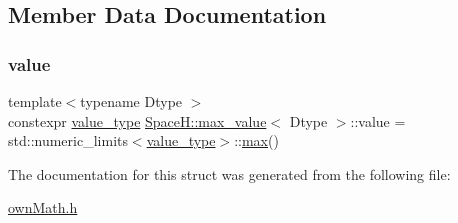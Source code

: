 \subsection{Member Data Documentation}
\mbox{\label{struct_space_h_1_1max__value_af27ab405cbcf92a3e6213eb9ae5c97b6}} 
\subsubsection{\texorpdfstring{value}{value}}
{\footnotesize\ttfamily template$<$typename Dtype $>$ \\
constexpr \mbox{\hyperlink{struct_space_h_1_1max__value_ae43b9c4bb300e03280887ef4144c40af}{value\+\_\+type}} \mbox{\hyperlink{struct_space_h_1_1max__value}{Space\+H\+::max\+\_\+value}}$<$ Dtype $>$\+::value = std\+::numeric\+\_\+limits$<$\mbox{\hyperlink{struct_space_h_1_1max__value_ae43b9c4bb300e03280887ef4144c40af}{value\+\_\+type}}$>$\+::\mbox{\hyperlink{namespace_space_h_aacd80a06ba9a8b2381301a3917d79cbe}{max}}()\hspace{0.3cm}{\ttfamily [static]}}



The documentation for this struct was generated from the following file\+:\begin{DoxyCompactItemize}
\item 
\mbox{\hyperlink{own_math_8h}{own\+Math.\+h}}\end{DoxyCompactItemize}
